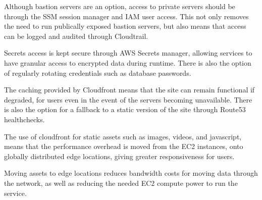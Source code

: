Although bastion servers are an option, access to private servers should be through the SSM session manager and IAM user access. This not only removes the need to run publically exposed bastion servers, but also means that access can be logged and audited through Cloudtrail.

Secrets access is kept secure through AWS Secrets manager, allowing services to have granular access to encrypted data during runtime. There is also the option of regularly rotating credentials such as database passwords.



The caching provided by Cloudfront means that the site can remain functional if degraded, for users even in the event of the servers becoming unavailable. There is also the option for a fallback to a static version of the site through Route53 healthchecks.


The use of cloudfront for static assets such as images, videos, and javascript, means that the performance overhead is moved from the EC2 instances, onto globally distributed edge locations, giving greater responsiveness for users.



Moving assets to edge locations reduces bandwidth costs for moving data through the network, as well as reducing the needed EC2 compute power to run the service.

